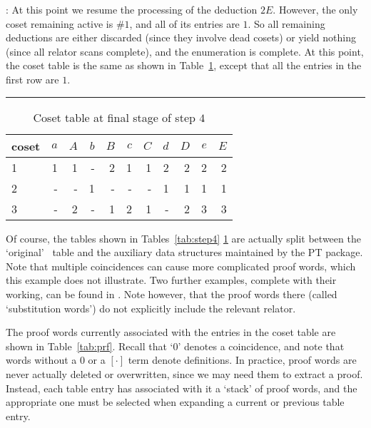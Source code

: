 :
At this point we resume the processing of the deduction $2E$.
However, the only coset remaining active is \#$1$, and all of its entries
  are $1$.
So all remaining deductions are either discarded (since they involve dead
  cosets) or yield nothing (since all relator scans complete), and the
  enumeration is complete.
At this point, the coset table is the same as shown in
  Table~\ref{tab:step4f}, except that all the entries in the first row
  are $1$.

\begin{table}
\hrule
\caption{Coset table at final stage of step $4$}
\label{tab:step4f}
\smallskip
\renewcommand{\arraystretch}{0.875}
\begin{tabular*}{\textwidth}{@{\extracolsep{\fill}}lrrrrrrrrrr} 
\hline\hline
coset & $a$ & $A$ & $b$ & $B$ & $c$ & $C$ & $d$ & $D$ & $e$ & $E$ \\ 
\hline
 1 & 1 & 1 & - & 2 & 1 & 1 & 2 & 2 & 2 & 2 \\
 2 & - & - & 1 & - & - & - & 1 & 1 & 1 & 1 \\
 3 & - & 2 & - & 1 & 2 & 1 & - & 2 & 3 & 3 \\
\hline\hline
\end{tabular*}
\end{table}

Of course, the tables shown in Tables~\ref{tab:step4} \amp
  \ref{tab:step4f} are actually split between the `original' \ace\ table
  and the auxiliary data structures maintained by the PT package.
%
Note that multiple coincidences can cause more complicated proof
  words, which this example does not illustrate.
%
Two further examples, complete with their working, can be found in 
  \cite{Lee70}.
Note however, that the proof words there (called `substitution words') do
  not explicitly include the relevant relator.

The proof words currently associated with the entries in the coset table
  are shown in Table~\ref{tab:prf}.
Recall that `$0$' denotes a coincidence, and note that words without a
  $0$ or a $[\cdot]$ term denote definitions.
In practice, proof words are never actually deleted or overwritten, since
  we may need them to extract a proof.
Instead, each table entry has associated with it a `stack' of proof words,
  and the appropriate one must be selected when expanding a current or
  previous table entry.

